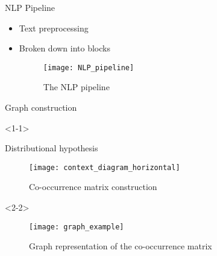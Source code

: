 \documentclass[t]{beamer}
\begin{document}
	\begin{frame}{NLP Pipeline}
		\begin{itemize}
			\item Text preprocessing
			\item Broken down into blocks
			\begin{figure}[H]
				\centering
				\texttt{[image: NLP\_pipeline]}		
				\caption{The NLP pipeline}
				\label{NLP_pipeline_label}
			\end{figure}
		\end{itemize}
	\end{frame}

	\begin{frame}{Graph construction}
		\begin{itemize}

			
			\begin{onlyenv}<2-2>
				\begin{figure}[H]
					\vspace{-0.5cm}
					\hspace*{-0.5cm}
					\centering
					\texttt{[image: graph\_example]}		
					\caption{Graph representation of the co-occurrence matrix}
					\label{}
				\end{figure}
			\end{onlyenv}
			
		\end{itemize}
	\end{frame}
\end{document}
